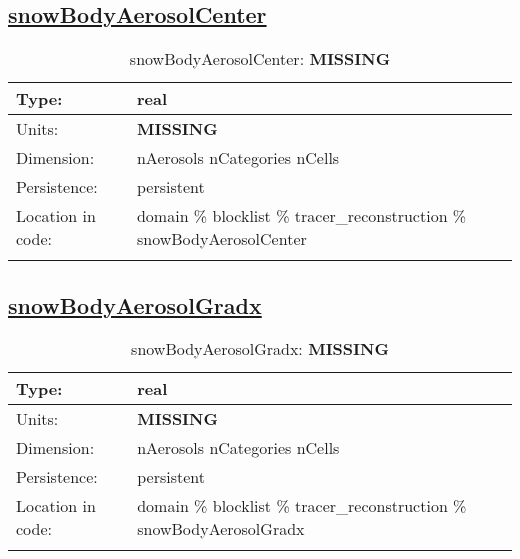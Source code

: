 \subsection[snowBodyAerosolCenter]{\hyperref[sec:var_tab_tracer_reconstruction]{snowBodyAerosolCenter}}
\label{subsec:var_sec_tracer_reconstruction_snowBodyAerosolCenter}
\begin{center}
\begin{longtable}{| p{2.0in} | p{4.0in} |}
        \hline 
        Type: & real \\
        \hline 
        Units: & {\bf \color{red} MISSING} \\
        \hline 
        Dimension: & nAerosols nCategories nCells \\
        \hline 
        Persistence: & persistent \\
        \hline 
         Location in code: & domain \% blocklist \% tracer\_reconstruction \% snowBodyAerosolCenter \\
         \hline 
    \caption{snowBodyAerosolCenter: {\bf \color{red} MISSING}}
\end{longtable}
\end{center}
\subsection[snowBodyAerosolGradx]{\hyperref[sec:var_tab_tracer_reconstruction]{snowBodyAerosolGradx}}
\label{subsec:var_sec_tracer_reconstruction_snowBodyAerosolGradx}
\begin{center}
\begin{longtable}{| p{2.0in} | p{4.0in} |}
        \hline 
        Type: & real \\
        \hline 
        Units: & {\bf \color{red} MISSING} \\
        \hline 
        Dimension: & nAerosols nCategories nCells \\
        \hline 
        Persistence: & persistent \\
        \hline 
         Location in code: & domain \% blocklist \% tracer\_reconstruction \% snowBodyAerosolGradx \\
         \hline 
    \caption{snowBodyAerosolGradx: {\bf \color{red} MISSING}}
\end{longtable}
\end{center}
